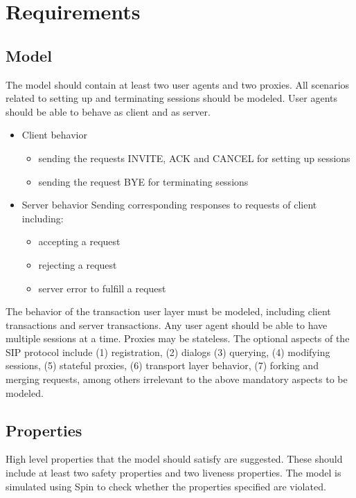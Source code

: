 \documentclass{article}
\begin{document}
\cite{modelchecking}


\section{Requirements}

\subsection{Model}

The model should contain at least two user agents and two proxies. All scenarios related to
setting up and terminating sessions should be modeled. User agents should be able to behave as
client and as server.

\begin{itemize}
\item Client behavior
	\begin{itemize}
	\item sending the requests INVITE, ACK and CANCEL for setting up
		sessions
	\item sending the request BYE for terminating sessions
	\end{itemize}
\item Server behavior
	Sending corresponding responses to requests of client including:
	\begin{itemize}
	\item accepting a request
	\item rejecting a request
	\item server error to fulfill a request
	\end{itemize}
\end{itemize}

The behavior of the transaction user layer must be modeled, including client transactions and server transactions. Any user agent should be able to have multiple sessions at a time. Proxies may be stateless.
The optional aspects of the SIP protocol include (1) registration, (2) dialogs (3) querying,
(4) modifying sessions, (5) stateful proxies, (6) transport layer behavior,
(7) forking and merging requests, among others irrelevant to the above mandatory aspects to be modeled.

\subsection{Properties}

High level properties that the model should satisfy are suggested.
These should include at least two safety properties and two liveness properties.
The model is simulated using Spin to check whether the properties specified are violated.
\end{document}
